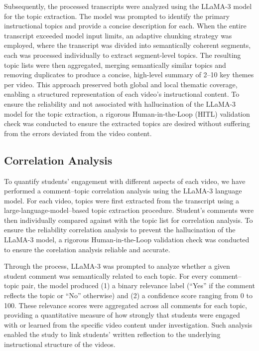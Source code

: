 Subsequently, the processed transcripts were analyzed using the LLaMA-3 model for the topic extraction. The model was prompted to identify the primary instructional topics and provide a concise description for each. When the entire transcript exceeded model input limits, an adaptive chunking strategy was employed, where the transcript was divided into semantically coherent segments, each was processed individually to extract segment-level topics. The resulting topic lists were then aggregated, merging semantically similar topics and removing duplicates to produce a concise, high-level summary of 2–10 key themes per video. This approach preserved both global and local thematic coverage, enabling a structured representation of each video’s instructional content. To ensure the reliability and not associated with hallucination of the LLaMA-3 model for the topic extraction, a rigorous Human-in-the-Loop (HITL) validation check was conducted to ensure the extracted topics are desired without suffering from the errors deviated from the video content.

\subsection{Correlation Analysis}


To quantify students’ engagement with different aspects of each video, we have performed a comment–topic correlation analysis using the LLaMA-3 language model. For each video, topics were first extracted from the transcript using a large-language-model–based topic extraction procedure. Student's comments were then individually compared against with the topic list for correlation analysis. To ensure the reliability correlation analysis to prevent the hallucination of the LLaMA-3 model, a rigorous Human-in-the-Loop validation check was conducted to ensure the corelation analysis reliable and accurate. 


Through the process, LLaMA-3 was prompted to analyze whether a given student comment was semantically related to each topic. For every comment–topic pair, the model produced (1) a binary relevance label (“Yes” if the comment reflects the topic or “No” otherwise) and (2) a confidence score ranging from 0 to 100. These relevance scores were aggregated across all comments for each topic, providing a quantitative measure of how strongly that students were engaged with or learned from the specific video content under investigation. Such analysis enabled the study to link students’ written reflection to the underlying instructional structure of the videos.

